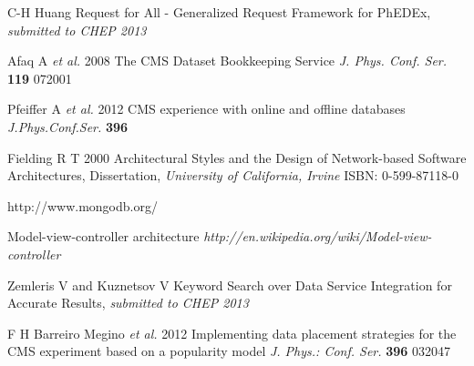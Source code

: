 \begin{thebibliography}{1}
C-H Huang Request for All - Generalized Request Framework for PhEDEx,
{\it submitted to CHEP 2013}

 Afaq A {\it et al.} 2008 The CMS Dataset Bookkeeping Service
{\it J. Phys. Conf. Ser.} 
{\bf 119} 072001

 Pfeiffer A {\it et al.} 2012 CMS experience with online and offline databases 
{\it J.Phys.Conf.Ser.} 
{\bf 396}

 Fielding R T 2000 Architectural Styles and the Design of Network-based Software Architectures, Dissertation, 
{\it University of California, Irvine} 
ISBN: 0-599-87118-0

http://www.mongodb.org/

 Model-view-controller architecture {\it http://en.wikipedia.org/wiki/Model-view-controller}

 Zemleris V and Kuznetsov V 
Keyword Search over Data Service Integration for Accurate Results,
{\it submitted to CHEP 2013}

 F H Barreiro Megino {\it et al.} 2012 Implementing data placement strategies for the CMS experiment based on a popularity model 
{\it J. Phys.: Conf. Ser.} {\bf 396} 032047

\end{thebibliography}
